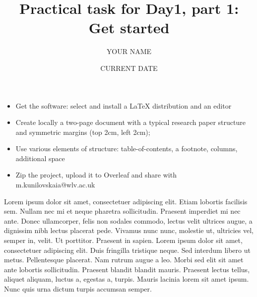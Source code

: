 \documentclass[a4paper,12pt]{article}
\title{Practical task for Day1, part 1: Get started}
\author{YOUR NAME}
\date{CURRENT DATE}
\begin{document}
	
\clearpage\maketitle
\thispagestyle{empty}
\maketitle
	

\begin{itemize}
	\item Get the software: select and install a LaTeX distribution and an editor
	\item Create locally a two-page document with a typical research paper structure and symmetric margins (top 2cm, left 2cm); 
	\item Use various elements of structure: table-of-contents, a footnote, columns, additional space 
	\item Zip the project, upload it to Overleaf and share with m.kunilovskaia@wlv.ac.uk
\end{itemize}
	

Lorem ipsum dolor sit amet, consectetuer adipiscing elit. Etiam lobortis facilisis sem. Nullam nec mi et neque pharetra sollicitudin. Praesent imperdiet mi nec ante. Donec ullamcorper, felis non sodales commodo, lectus velit ultrices augue, a dignissim nibh lectus placerat pede. Vivamus nunc nunc, molestie ut, ultricies vel, semper in, velit. Ut porttitor. Praesent in sapien. Lorem ipsum dolor sit amet, consectetuer adipiscing elit. Duis fringilla tristique neque. Sed interdum libero ut metus. Pellentesque placerat. Nam rutrum augue a leo. Morbi sed elit sit amet ante lobortis sollicitudin. Praesent blandit blandit mauris. Praesent lectus tellus, aliquet aliquam, luctus a, egestas a, turpis. Mauris lacinia lorem sit amet ipsum. Nunc quis urna dictum turpis accumsan semper.
\end{document}
